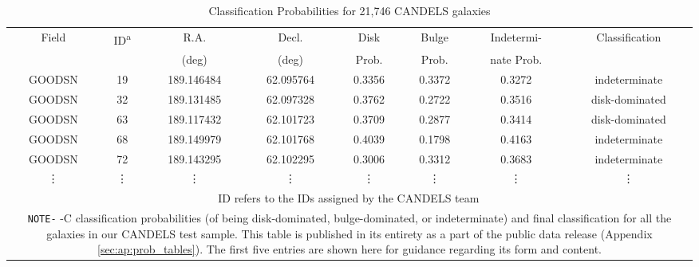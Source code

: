 \begin{table}[htbp]
  \centering
  \caption{Classification Probabilities for 21,746 CANDELS galaxies \label{tab:lt_candels}}
  \begin{tabular}{cccccccc}
  \hline
  \hline
  Field & ID\textsuperscript{a} & R.A. & Decl. & Disk & Bulge & Indetermi- & Classification\\
  & & (deg) & (deg) & Prob. & Prob. & nate Prob.& \\
  \hline
  GOODSN & 19 & 189.146484 & 62.095764 & 0.3356 & 0.3372 & 0.3272 & indeterminate\\
  GOODSN & 32 & 189.131485 & 62.097328 & 0.3762 & 0.2722 & 0.3516 & disk-dominated\\
  GOODSN & 63 & 189.117432 & 62.101723 & 0.3709 & 0.2877 & 0.3414 & disk-dominated\\
  GOODSN & 68 & 189.149979 & 62.101768 & 0.4039 & 0.1798 & 0.4163 & indeterminate\\
  GOODSN & 72 & 189.143295 & 62.102295 & 0.3006 & 0.3312 & 0.3683 & indeterminate\\
  \vdots & \vdots &\vdots &\vdots &\vdots &\vdots &\vdots &\vdots\\
  \hline
  \multicolumn{8}{p{0.9\textwidth}}{\vskip 0.01cm \small ID refers to the IDs assigned by the CANDELS team\,\citep{candels_1,candels_2}}\\
  \multicolumn{8}{p{0.9\textwidth}}{\small \texttt{NOTE-} \gamornet{}-C classification probabilities (of being disk-dominated, bulge-dominated, or indeterminate) and final classification for all the galaxies in our CANDELS test sample. This table is published in its entirety as a part of the public data release (Appendix \ref{sec:ap:prob_tables}). The first five entries are shown here for guidance regarding its form and content.}\\
  \end{tabular}
\end{table}

